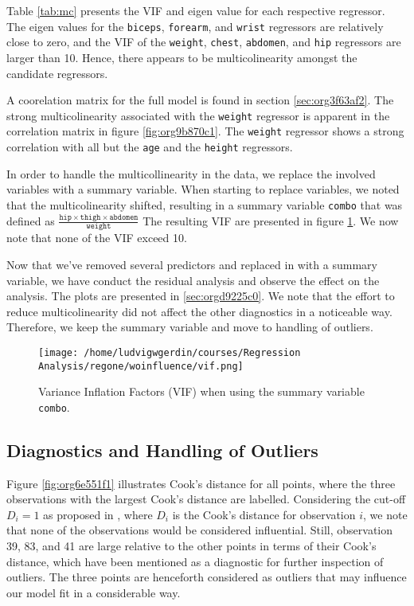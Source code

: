 \documentclass[11pt]{article}
\begin{document}
Table \ref{tab:mc} presents the VIF and eigen value for each respective regressor. The eigen values for the 
\texttt{biceps}, \texttt{forearm}, and \texttt{wrist} regressors are relatively close to zero, and the
VIF of the \texttt{weight}, \texttt{chest}, \texttt{abdomen}, and \texttt{hip} regressors are larger than 10.
Hence, there appears to be multicolinearity amongst the candidate regressors.

A coorelation matrix for the full model is found in section \ref{sec:org3f63af2}. The strong multicolinearity
associated with the \texttt{weight} regressor is apparent in the correlation matrix in figure
\ref{fig:org9b870c1}. The \texttt{weight} regressor shows a strong correlation with all but the \texttt{age} and
the \texttt{height} regressors.

 

In order to handle the multicollinearity in the data, we replace the involved variables with a summary variable.
When starting to replace variables, we noted that the multicolinearity shifted, resulting in a summary variable
\texttt{combo} that was defined as \(\frac{\texttt{hip}\times\texttt{thigh}\times\texttt{abdomen}}{\texttt{weight}}\)
The resulting VIF are presented in figure \ref{fig:orgdeb4a0a}. We now note that none of the VIF exceed 10.

Now that we've removed several predictors and replaced in with a summary variable, we have conduct the 
residual analysis and observe the effect on the analysis. The plots are presented in \ref{sec:orgd9225c0}. We note that 
the effort to reduce multicolinearity did not affect the other diagnostics in a noticeable way. Therefore,
we keep the summary variable and move to handling of outliers.

\begin{figure}[htbp]
\centering
\texttt{[image: /home/ludvigwgerdin/courses/Regression Analysis/regone/woinfluence/vif.png]}
\caption{\label{fig:orgdeb4a0a}
Variance Inflation Factors (VIF) when using the summary variable \texttt{combo}.}
\end{figure}   

\subsection{Diagnostics and Handling of Outliers}
\label{sec:orgae23f68}

Figure \ref{fig:org6e551f1} illustrates Cook's distance for all points, where the three observations with the largest 
Cook's distance are labelled. Considering the cut-off \(D_i = 1\) as proposed in \cite{Montgomery2012}, 
where \(D_i\) is the Cook's distance for observation \(i\), we note that none of the observations would be 
considered influential. Still, observation 39, 83, and 41 are large relative
to the other points in terms of their Cook's distance, which have been mentioned as a diagnostic for further
inspection of outliers. \cite{Fox1991} The three points are henceforth considered as outliers that may
influence our model fit in a considerable way.
\end{document}
